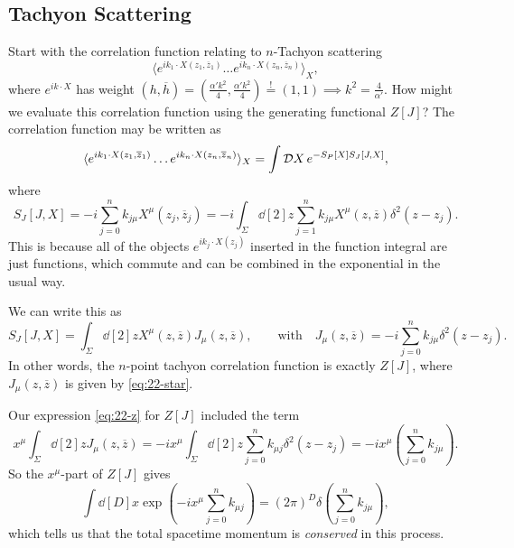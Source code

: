 \subsection{Tachyon Scattering}%
\label{sub:tachyon_scattering}

Start with the correlation function relating to $n$-Tachyon scattering
\begin{equation}
  \langle e^{i k_1 \cdot X(z_1, \overline{z}{}_1)} \dots e^{i k_n \cdot X(z_n, \overline{z}{}_n)} \rangle_X,
\end{equation}
where $e^{i k \cdot X}$ has weight $(h, \overline{h}{}) = (\frac{\alpha' k^2}{4}, \frac{\alpha' k^2}{4}) \stackrel{!}{=} (1, 1) \implies k^2 = \frac{4}{\alpha'}$.
How might we evaluate this correlation function using the generating functional $Z[J]$?
The correlation function may be written as
\begin{equation}
  \langle e^{i k_1 \cdot X(z_1, \overline{z}{}_1)} \dots e^{i k_n \cdot X(z_n, \overline{z}{}_n)} \rangle_X
  =  \int \mathop{\mathcal{D} X} e^{-S_P[X] S_J[J, X]},
\end{equation}
where
\begin{equation}
  S_J[J, X] = -i \sum_{j = 0}^n k_{j \mu} X^{\mu}(z_j, \overline{z}{}_j) = -i \int_\Sigma \dd[2]{z} \sum_{j=1}^n k_{j \mu} X^{\mu}(z, \overline{z}{}) \delta^2 (z - z_j).
\end{equation}
This is because all of the objects $e^{i k_j \cdot X(z_j)}$ inserted in the function integral are just functions, which commute and can be combined in the exponential in the usual way.

We can write this as
\begin{equation}
  S_J[J, X] = \int_{\Sigma} \dd[2]{z} X^{\mu}(z, \overline{z}{}) J_\mu(z, \overline{z}{}), \qquad \text{with} \quad J_{\mu}(z, \overline{z}{}) = -i \sum_{j=0}^{n} k_{j \mu} \delta^2 (z - z_j).
  \label{eq:22-star}
\end{equation}
In other words, the $n$-point tachyon correlation function is exactly $Z[J]$, where $J_{\mu}(z, \overline{z}{})$ is given by \eqref{eq:22-star}.

Our expression \eqref{eq:22-z} for $Z[J]$ included the term
\begin{equation}
  x^{\mu} \int_{\Sigma} \dd[2]{z} J_{\mu}(z, \overline{z}{}) = -i x^{\mu} \int_{\Sigma} \dd[2]{z} \sum_{j = 0}^{n} k_{\mu j} \delta^2(z - z_j) = -i x^{\mu} \left( \sum_{j=0}^{n} k_{j \mu} \right).
\end{equation}
So the $x^{\mu}$-part of $Z[J]$ gives
\begin{equation}
  \int \dd[D]{x} \exp(-i x^{\mu} \sum_{j=0}^{n} k_{\mu j}) = (2\pi)^D \delta \left( \sum_{j=0}^n k_{j \mu} \right),
\end{equation}
which tells us that the total spacetime momentum is \emph{conserved} in this process.

